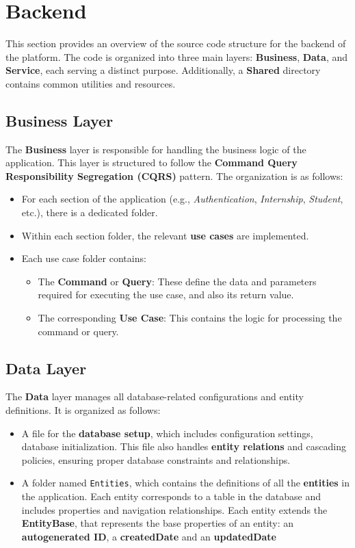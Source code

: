 \section{Backend}
This section provides an overview of the source code structure for the backend of the platform. The code is organized into three main layers: \textbf{Business}, \textbf{Data}, and \textbf{Service}, each serving a distinct purpose. Additionally, a \textbf{Shared} directory contains common utilities and resources.

\subsection{Business Layer}
The \textbf{Business} layer is responsible for handling the business logic of the application. This layer is structured to follow the \textbf{Command Query Responsibility Segregation (CQRS)} pattern. The organization is as follows:

\begin{itemize}
    \item For each section of the application (e.g., \textit{Authentication}, \textit{Internship}, \textit{Student}, etc.), there is a dedicated folder.
    \item Within each section folder, the relevant \textbf{use cases} are implemented. 
    \item Each use case folder contains:
    \begin{itemize}
        \item The \textbf{Command} or \textbf{Query}: These define the data and parameters required for executing the use case, and also its return value.
        \item The corresponding \textbf{Use Case}: This contains the logic for processing the command or query.
    \end{itemize}
\end{itemize}

\subsection{Data Layer}
The \textbf{Data} layer manages all database-related configurations and entity definitions. It is organized as follows:

\begin{itemize}
    \item A file for the \textbf{database setup}, which includes configuration settings, database initialization. This file also handles \textbf{entity relations} and cascading policies, ensuring proper database constraints and relationships.
    \item A folder named \texttt{Entities}, which contains the definitions of all the \textbf{entities} in the application. Each entity corresponds to a table in the database and includes properties and navigation relationships. Each entity extends the \textbf{EntityBase}, that represents the base properties of an entity: an \textbf{autogenerated ID}, a \textbf{createdDate} and an \textbf{updatedDate}
\end{itemize}

